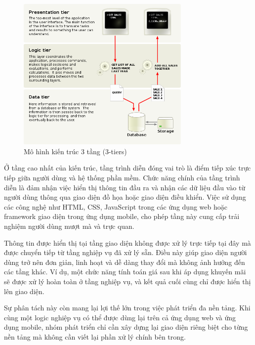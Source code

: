 \begin{figure}[h]
  \centering
  \includegraphics[width=0.75\textwidth]{images/layer.png}
  \caption{Mô hình kiến trúc 3 tầng (3-tiers)}
  \label{fig:15}
\end{figure}
  
  \begin{flushleft}
  \hspace*{0.8cm}Ở tầng cao nhất của kiến trúc, tầng trình diễn đóng vai trò là điểm tiếp xúc trực tiếp giữa người dùng và hệ thống phần mềm. Chức năng chính của tầng trình diễn là đảm nhận việc hiển thị thông tin đầu ra và nhận các dữ liệu đầu vào từ người dùng thông qua giao diện đồ họa hoặc giao diện điều khiển. Việc sử dụng các công nghệ như HTML, CSS, JavaScript trong các ứng dụng web hoặc framework giao diện trong ứng dụng mobile, cho phép tầng này cung cấp trải nghiệm người dùng mượt mà và trực quan.
  \end{flushleft}
  
  \begin{flushleft}
  \hspace*{0.8cm}Thông tin được hiển thị tại tầng giao diện không được xử lý trực tiếp tại đây mà được chuyển tiếp từ tầng nghiệp vụ đã xử lý sẵn. Điều này giúp giao diện người dùng trở nên đơn giản, linh hoạt và dễ dàng thay đổi mà không ảnh hưởng đến các tầng khác. Ví dụ, một chức năng tính toán giá sau khi áp dụng khuyến mãi sẽ được xử lý hoàn toàn ở tầng nghiệp vụ, và kết quả cuối cùng chỉ được hiển thị lên giao diện.
  \end{flushleft}
  
  \begin{flushleft}
  \hspace*{0.8cm}Sự phân tách này còn mang lại lợi thế lớn trong việc phát triển đa nền tảng. Khi cùng một logic nghiệp vụ có thể được dùng lại trên cả ứng dụng web và ứng dụng mobile, nhóm phát triển chỉ cần xây dựng lại giao diện riêng biệt cho từng nền tảng mà không cần viết lại phần xử lý chính bên trong.
  \end{flushleft}
  
